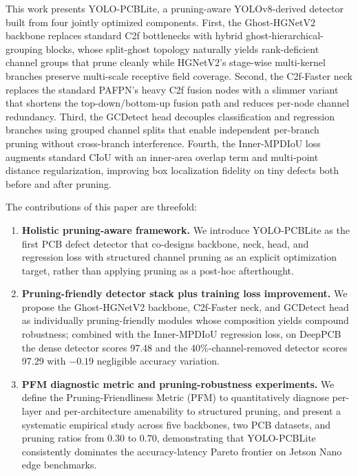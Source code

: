 \documentclass[conference]{IEEEtran}
\newcommand{\simulated}[1]{#1}
\providecommand{\DIFadd}[1]{{\protect\color{blue}#1}}
\begin{document}
\DIFadd{This work presents YOLO-PCBLite, a pruning-aware YOLOv8-derived detector built from four jointly optimized components.} \DIFadd{First, the Ghost-HGNetV2 backbone replaces standard C2f bottlenecks with hybrid ghost-hierarchical-grouping blocks, whose split-ghost topology naturally yields rank-deficient channel groups that prune cleanly while HGNetV2's stage-wise multi-kernel branches preserve multi-scale receptive field coverage.} \DIFadd{Second, the C2f-Faster neck replaces the standard PAFPN's heavy C2f fusion nodes with a slimmer variant that shortens the top-down/bottom-up fusion path and reduces per-node channel redundancy.} \DIFadd{Third, the GCDetect head decouples classification and regression branches using grouped channel splits that enable independent per-branch pruning without cross-branch interference.} \DIFadd{Fourth, the Inner-MPDIoU loss augments standard CIoU with an inner-area overlap term and multi-point distance regularization, improving box localization fidelity on tiny defects both before and after pruning.}

\DIFadd{The contributions of this paper are threefold:}
\begin{enumerate}
    \item \DIFadd{\textbf{Holistic pruning-aware framework.} We introduce YOLO-PCBLite as the first PCB defect detector that co-designs backbone, neck, head, and regression loss with structured channel pruning as an explicit optimization target, rather than applying pruning as a post-hoc afterthought.}
    \item \textbf{Pruning-friendly detector stack plus training loss improvement.} We propose the Ghost-HGNetV2 backbone, C2f-Faster neck, and GCDetect head as individually pruning-friendly modules whose composition yields compound robustness; combined with the Inner-MPDIoU regression loss, on DeepPCB the dense detector scores 97.48 and the 40\%-channel-removed detector scores 97.29 with $-0.19$ negligible accuracy variation.
    \item \DIFadd{\textbf{PFM diagnostic metric and pruning-robustness experiments.} We define the Pruning-Friendliness Metric (PFM) to quantitatively diagnose per-layer and per-architecture amenability to structured pruning, and present a systematic empirical study across five backbones, two PCB datasets, and pruning ratios from $\simulated{0.30}$ to $\simulated{0.70}$, demonstrating that YOLO-PCBLite consistently dominates the accuracy-latency Pareto frontier on Jetson Nano edge benchmarks.}
\end{enumerate}
\end{document}
